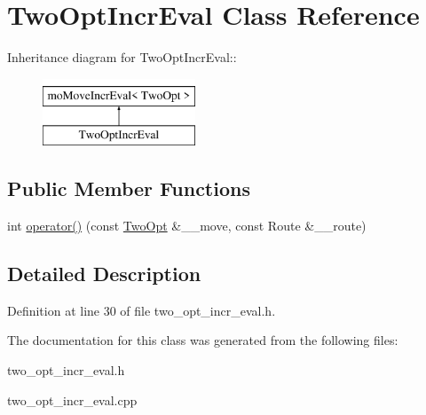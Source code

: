 \hypertarget{classTwoOptIncrEval}{
\section{Two\-Opt\-Incr\-Eval Class Reference}
\label{classTwoOptIncrEval}
}
Inheritance diagram for Two\-Opt\-Incr\-Eval::\begin{figure}[H]
\begin{center}
\leavevmode
\includegraphics[height=2cm]{classTwoOptIncrEval}
\end{center}
\end{figure}
\subsection*{Public Member Functions}
\begin{CompactItemize}
\item 
\hypertarget{classTwoOptIncrEval_48500077e651c4c6152daef8a396be39}{
int \hyperlink{classTwoOptIncrEval_48500077e651c4c6152daef8a396be39}{operator()} (const \hyperlink{classTwoOpt}{Two\-Opt} \&\_\-\_\-move, const Route \&\_\-\_\-route)}
\label{classTwoOptIncrEval_48500077e651c4c6152daef8a396be39}

\end{CompactItemize}


\subsection{Detailed Description}




Definition at line 30 of file two\_\-opt\_\-incr\_\-eval.h.

The documentation for this class was generated from the following files:\begin{CompactItemize}
\item 
two\_\-opt\_\-incr\_\-eval.h\item 
two\_\-opt\_\-incr\_\-eval.cpp\end{CompactItemize}
